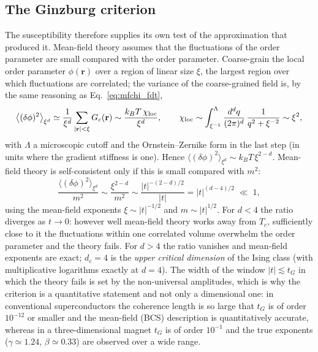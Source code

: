 \documentclass[10pt,a4paper]{article}
\theoremstyle{remark}
\begin{document}
\subsection{The Ginzburg criterion}
\label{sec:mfchi:ginzburg}

The susceptibility therefore supplies its own test of the approximation that
produced it. Mean-field theory assumes that the fluctuations of the order
parameter are small compared with the order parameter. Coarse-grain the local
order parameter $\phi(\mathbf r)$ over a region of linear size $\xi$, the
largest region over which fluctuations are correlated; the variance of the
coarse-grained field is, by the same reasoning as Eq.~\eqref{eq:mfchi_fdt},
\[
  \big\langle(\delta\phi)^{2}\big\rangle_{\xi^{d}}
  \simeq\frac{1}{\xi^{d}}\sum_{|\mathbf r|<\xi}G_c(\mathbf r)
  \sim\frac{k_BT\,\chi_{\rm loc}}{\xi^{d}} ,
  \qquad
  \chi_{\rm loc}\sim\int_{\xi^{-1}}^{\Lambda}\frac{d^{d}q}{(2\pi)^{d}}\,\frac{1}{q^{2}+\xi^{-2}}\sim\xi^{2} ,
\]
with $\Lambda$ a microscopic cutoff and the Ornstein--Zernike form in the
last step (in units where the gradient stiffness is one). Hence
$\langle(\delta\phi)^{2}\rangle_{\xi^{d}}\sim k_BT\,\xi^{2-d}$. Mean-field
theory is self-consistent only if this is small compared with $m^{2}$:
\begin{equation}\label{eq:ginzburg}
  \frac{\langle(\delta\phi)^{2}\rangle_{\xi^{d}}}{m^{2}}
  \sim\frac{\xi^{2-d}}{m^{2}}
  \sim\frac{|t|^{-(2-d)/2}}{|t|}=|t|^{(d-4)/2}\;\ll\;1 ,
\end{equation}
using the mean-field exponents $\xi\sim|t|^{-1/2}$ and $m\sim|t|^{1/2}$. For
$d<4$ the ratio diverges as $t\to0$: however well mean-field theory works away
from $T_c$, sufficiently close to it the fluctuations within one correlated
volume overwhelm the order parameter and the theory fails. For $d>4$ the ratio
vanishes and mean-field exponents are exact; $d_c=4$ is the \emph{upper
critical dimension} of the Ising class (with multiplicative logarithms exactly
at $d=4$). The width of the window $|t|\lesssim t_G$ in which the theory fails
is set by the non-universal amplitudes, which is why the criterion is a
quantitative statement and not only a dimensional one: in conventional
superconductors the coherence length is so large that $t_G$ is of order
$10^{-12}$ or smaller and the mean-field (BCS) description is quantitatively
accurate, whereas in a
three-dimensional magnet $t_G$ is of order $10^{-1}$ and the true exponents
($\gamma\simeq1.24$, $\beta\simeq0.33$) are observed over a wide range.
\end{document}
